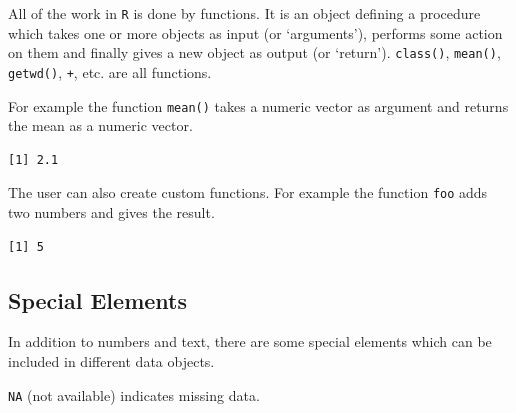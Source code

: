 All of the work in \texttt{R} is done by functions. It is an object
defining a procedure which takes one or more objects as input (or
`arguments'), performs some action on them and finally gives a new
object as output (or `return'). \texttt{class()}, \texttt{mean()},
\texttt{getwd()}, \texttt{+}, etc. are all functions.

For example the function \texttt{mean()} takes a numeric vector as
argument and returns the mean as a numeric vector.

\begin{Shaded}
\begin{Highlighting}[]
\StringTok{ }\NormalTok{(}\NormalTok{, }\NormalTok{, }\NormalTok{)}
\end{Highlighting}
\end{Shaded}

\begin{verbatim}
[1] 2.1
\end{verbatim}

The user can also create custom functions. For example the function
\texttt{foo} adds two numbers and gives the result.

\begin{Shaded}
\begin{Highlighting}[]
\StringTok{ }
\StringTok{ }\OperatorTok{+}\StringTok{ }
\NormalTok{\}}
\NormalTok{(}\NormalTok{,}\NormalTok{)}
\end{Highlighting}
\end{Shaded}

\begin{verbatim}
[1] 5
\end{verbatim}

\hypertarget{special-elements}{%
\subsection{Special Elements}\label{special-elements}}

In addition to numbers and text, there are some special elements which
can be included in different data objects.

\texttt{NA} (not available) indicates missing data.

\begin{Shaded}
\begin{Highlighting}[]
\StringTok{ }\NormalTok{(}\NormalTok{, }\NormalTok{, }\NormalTok{)}
\StringTok{ }\NormalTok{(}\NormalTok{, }\NormalTok{, }\NormalTok{)}
\StringTok{ }\NormalTok{(}\NormalTok{, }\NormalTok{, }\NormalTok{, }\NormalTok{, }\NormalTok{)}
\end{Highlighting}
\end{Shaded}


